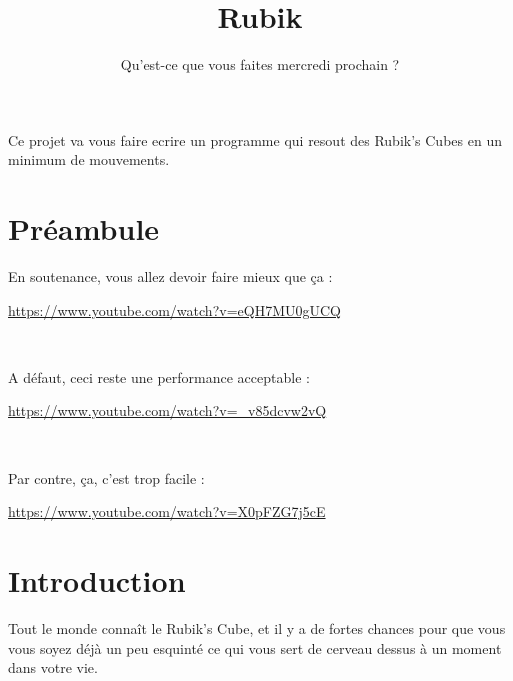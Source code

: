 \documentclass{42}
\begin{document}
\title{Rubik}
\subtitle{Qu'est-ce que vous faites mercredi prochain ?}


\summary
{
	Ce projet va vous faire ecrire un programme qui resout des Rubik's Cubes en un minimum de mouvements.

}

\maketitle

\tableofcontents


\newpage
\chapter{Pr\'eambule}

En soutenance, vous allez devoir faire mieux que \c{c}a :

\url{https://www.youtube.com/watch?v=eQH7MU0gUCQ}

\

A d\'efaut, ceci reste une performance acceptable :

\url{https://www.youtube.com/watch?v=_v85dcvw2vQ}

\

Par contre, \c{c}a, c'est trop facile :

\url{https://www.youtube.com/watch?v=X0pFZG7j5cE}

\newpage

%
%

\chapter{Introduction}

Tout le monde conna\^it le Rubik's Cube, et il y a de fortes chances pour que vous vous soyez d\'ej\`a un peu esquint\'e ce qui vous sert de cerveau dessus \`a un moment dans votre vie.

\
\end{document}
